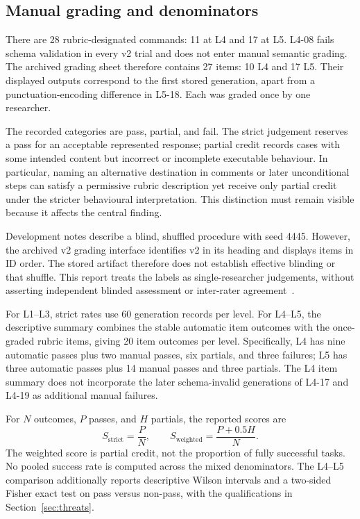 \documentclass[journal]{IEEEtran}
\begin{document}
\subsection{Manual grading and denominators}
There are 28 rubric-designated commands: 11 at L4 and 17 at L5. L4-08 fails schema validation in every v2 trial and does not enter manual semantic grading. The archived grading sheet therefore contains 27 items: 10 L4 and 17 L5. Their displayed outputs correspond to the first stored generation, apart from a punctuation-encoding difference in L5-18. Each was graded once by one researcher.

The recorded categories are pass, partial, and fail. The strict judgement reserves a pass for an acceptable represented response; partial credit records cases with some intended content but incorrect or incomplete executable behaviour. In particular, naming an alternative destination in comments or later unconditional steps can satisfy a permissive rubric description yet receive only partial credit under the stricter behavioural interpretation. This distinction must remain visible because it affects the central finding.

Development notes describe a blind, shuffled procedure with seed 4445. However, the archived v2 grading interface identifies v2 in its heading and displays items in ID order. The stored artifact therefore does not establish effective blinding or that shuffle. This report treats the labels as single-researcher judgements, without asserting independent blinded assessment or inter-rater agreement~\cite{artstein2008agreement}.

For L1--L3, strict rates use 60 generation records per level. For L4--L5, the descriptive summary combines the stable automatic item outcomes with the once-graded rubric items, giving 20 item outcomes per level. Specifically, L4 has nine automatic passes plus two manual passes, six partials, and three failures; L5 has three automatic passes plus 14 manual passes and three partials. The L4 item summary does not incorporate the later schema-invalid generations of L4-17 and L4-19 as additional manual failures.

For $N$ outcomes, $P$ passes, and $H$ partials, the reported scores are
\begin{equation}
 S_{\mathrm{strict}}=\frac{P}{N},\qquad
 S_{\mathrm{weighted}}=\frac{P+0.5H}{N}.
\end{equation}
The weighted score is partial credit, not the proportion of fully successful tasks. No pooled success rate is computed across the mixed denominators. The L4--L5 comparison additionally reports descriptive Wilson intervals and a two-sided Fisher exact test on pass versus non-pass, with the qualifications in Section~\ref{sec:threats}.
\end{document}
